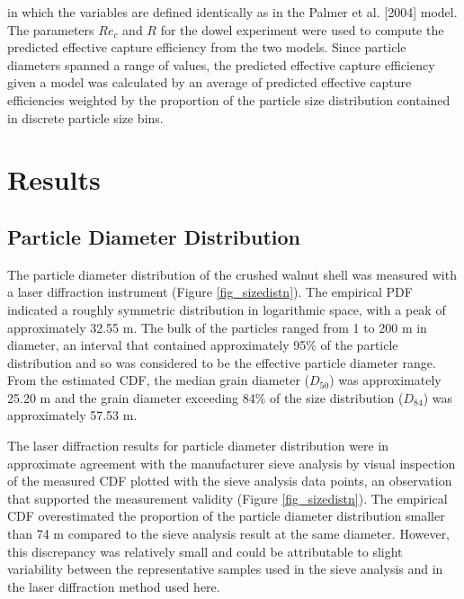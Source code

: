\documentclass[12pt]{article}
\begin{document}
\noindent in which the variables are defined identically as in the Palmer et al. [2004] model. The parameters $Re_c$ and $R$ for the dowel experiment were used to compute the predicted effective capture efficiency from the two models. Since particle diameters spanned a range of values, the predicted effective capture efficiency given a model was calculated by an average of predicted effective capture efficiencies weighted by the proportion of the particle size distribution contained in discrete particle size bins.

\section{Results}

\subsection{Particle Diameter Distribution}

The particle diameter distribution of the crushed walnut shell was measured with a laser diffraction instrument (Figure \ref{fig_sizedistn}). The empirical PDF indicated a roughly symmetric distribution in logarithmic space, with a peak of approximately 32.55 \textmu m. The bulk of the particles ranged from 1 to 200 \textmu m in diameter, an interval that contained approximately 95\% of the particle distribution and so was considered to be the effective particle diameter range. From the estimated CDF, the median grain diameter ($D_{50}$) was approximately 25.20 \textmu m and the grain diameter exceeding 84\% of the size distribution ($D_{84}$) was approximately 57.53 \textmu m.

The laser diffraction results for particle diameter distribution were in approximate agreement with the manufacturer sieve analysis by visual inspection of the measured CDF plotted with the sieve analysis data points, an observation that supported the measurement validity (Figure \ref{fig_sizedistn}). The empirical CDF overestimated the proportion of the particle diameter distribution smaller than 74 \textmu m compared to the sieve analysis result at the same diameter. However, this discrepancy was relatively small and could be attributable to slight variability between the representative samples used in the sieve analysis and in the laser diffraction method used here.
\end{document}
